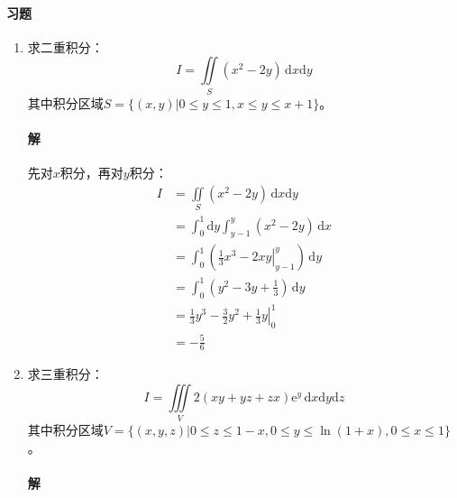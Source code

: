 \documentclass[fontset=none,openany,a4paper]{ctexbook}
\begin{document}
\paragraph{习题}

\begin{enumerate}

    \item 求二重积分：
    \[
    I = \iint\limits_S (x^2-2y)\,\mathrm{d}x\mathrm{d}y
    \]
    其中积分区域$S=\{(x,y)|0\leqslant y\leqslant1,x\leqslant y\leqslant x+1\}$。

    \paragraph{解}

    先对$x$积分，再对$y$积分：
    \begin{align*}
        I
        &= \iint\limits_S (x^2-2y)\,\mathrm{d}x\mathrm{d}y \\
        &= \int_0^1 \mathrm{d}y \int_{y-1}^y (x^2-2y)\,\mathrm{d}x \\
        &= \int_0^1 \left(\left.\frac{1}{3}x^3-2xy\right|_{y-1}^y\right)\,\mathrm{d}y \\
        &= \int_0^1 \left(y^2-3y+\frac{1}{3}\right)\,\mathrm{d}y \\
        &= \left.\frac{1}{3}y^3-\frac{3}{2}y^2+\frac{1}{3}y\right|_0^1 \\
        &= -\frac{5}{6}
    \end{align*}

    \item 求三重积分：
    \[
    I = \iiint\limits_V 2(xy+yz+zx)\mathrm{e}^y\,\mathrm{d}x\mathrm{d}y\mathrm{d}z
    \]
    其中积分区域$V=\{(x,y,z)|0\leqslant z\leqslant 1-x,0\leqslant y\leqslant\ln(1+x),0\leqslant x\leqslant1\}$。

    \paragraph{解}


\end{enumerate}
\end{document}
